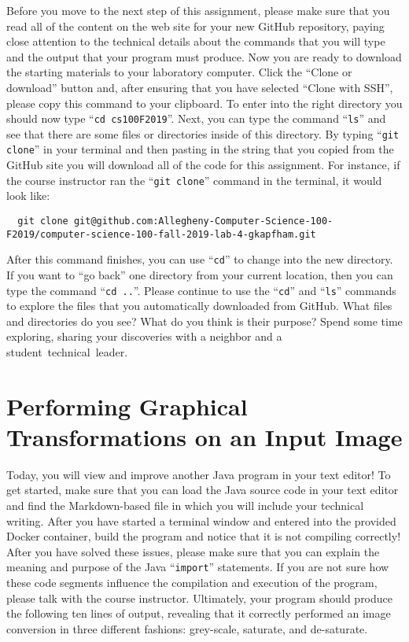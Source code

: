 \documentclass[11pt]{article}
\newcommand{\command}[1]{``\lstinline{#1}''}
\newcommand{\step}[1]{``{#1}''}
\begin{document}
Before you move to the next step of this assignment, please make sure that you
read all of the content on the web site for your new GitHub repository, paying
close attention to the technical details about the commands that you will type
and the output that your program must produce. Now you are ready to download the
starting materials to your laboratory computer. Click the ``Clone or download''
button and, after ensuring that you have selected ``Clone with SSH'', please
copy this command to your clipboard. To enter into the right directory you
should now type \command{cd cs100F2019}. Next, you can type the command
\command{ls} and see that there are some files or directories inside of this
directory. By typing \command{git clone} in your terminal and then pasting in
the string that you copied from the GitHub site you will download all of the
code for this assignment. For instance, if the course instructor ran the
\command{git clone} command in the terminal, it would look like:

\begin{lstlisting}
  git clone git@github.com:Allegheny-Computer-Science-100-F2019/computer-science-100-fall-2019-lab-4-gkapfham.git
\end{lstlisting}

After this command finishes, you can use \command{cd} to change into the new
directory. If you want to \step{go back} one directory from your current
location, then you can type the command \command{cd ..}. Please continue to use
the \command{cd} and \command{ls} commands to explore the files that you
automatically downloaded from GitHub. What files and directories do you see?
What do you think is their purpose? Spend some time exploring, sharing your
discoveries with a neighbor and a \mbox{student technical leader}.

\section*{Performing Graphical Transformations on an Input Image}

Today, you will view and improve another Java program in your text editor! To
get started, make sure that you can load the Java source code in your text
editor and find the Markdown-based file in which you will include your technical
writing. After you have started a terminal window and entered into the provided
Docker container, build the program and notice that it is not compiling
correctly! After you have solved these issues, please make sure that you can
explain the meaning and purpose of the Java \command{import} statements. If you
are not sure how these code segments influence the compilation and execution of
the program, please talk with the course instructor. Ultimately, your program
should produce the following ten lines of output, revealing that it correctly
performed an image conversion in three different fashions: grey-scale, saturate,
and de-saturate.
\end{document}

